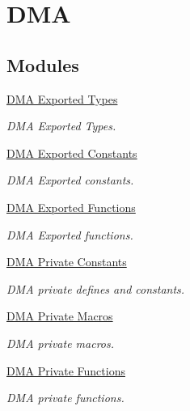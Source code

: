 \hypertarget{group___d_m_a}{}\section{D\+MA}
\label{group___d_m_a}
\subsection*{Modules}
\begin{DoxyCompactItemize}
\item 
\hyperlink{group___d_m_a___exported___types}{D\+M\+A Exported Types}
\begin{DoxyCompactList}\small\item\em D\+MA Exported Types. \end{DoxyCompactList}\item 
\hyperlink{group___d_m_a___exported___constants}{D\+M\+A Exported Constants}
\begin{DoxyCompactList}\small\item\em D\+MA Exported constants. \end{DoxyCompactList}\item 
\hyperlink{group___d_m_a___exported___functions}{D\+M\+A Exported Functions}
\begin{DoxyCompactList}\small\item\em D\+MA Exported functions. \end{DoxyCompactList}\item 
\hyperlink{group___d_m_a___private___constants}{D\+M\+A Private Constants}
\begin{DoxyCompactList}\small\item\em D\+MA private defines and constants. \end{DoxyCompactList}\item 
\hyperlink{group___d_m_a___private___macros}{D\+M\+A Private Macros}
\begin{DoxyCompactList}\small\item\em D\+MA private macros. \end{DoxyCompactList}\item 
\hyperlink{group___d_m_a___private___functions}{D\+M\+A Private Functions}
\begin{DoxyCompactList}\small\item\em D\+MA private functions. \end{DoxyCompactList}\end{DoxyCompactItemize}
